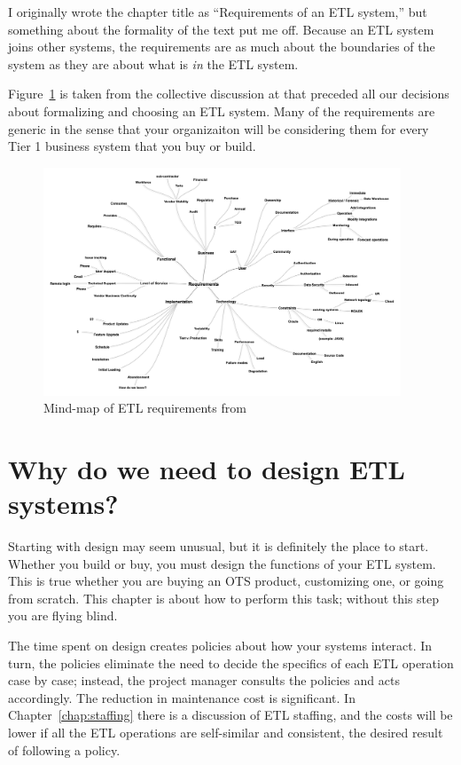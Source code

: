 \documentclass[11pt,letterpaper,twosided]{memoir}
\begin{document}
I originally wrote the chapter title as ``Requirements of an
ETL system,'' but something about the formality of the text
put me off. Because an ETL system joins other systems, the 
requirements are as much about the boundaries of the system as
they are about what is \emph{in} the ETL system.

Figure~\ref{fig:mindmap} is taken from the collective discussion
at \UR that preceded all our decisions about formalizing and 
choosing an ETL system. Many of the requirements are generic
in the sense that your organizaiton will be considering them
for every Tier 1 business system that you buy or build.

\begin{figure}
\includegraphics[width=0.95\textwidth]{mindmap.png}
\caption{Mind-map of ETL requirements from \UR}
\label{fig:mindmap}
\end{figure}

\section{Why do we need to design ETL systems?}

Starting with design may seem unusual, but it is definitely the
place to start.  Whether you build or buy, you must design the
functions of your ETL system. This is true whether you are buying
an OTS product, customizing one, or going from scratch. This chapter
is about how to perform this task; without this step you are flying
blind.

The time spent on design creates policies about how your systems
interact.  In turn, the policies eliminate the need to decide the
specifics of each ETL operation case by case; instead, the project
manager consults the policies and acts accordingly. The reduction
in maintenance cost is significant. In Chapter~\ref{chap:staffing}
there is a discussion of ETL staffing, and the costs will be lower
if all the ETL operations are self-similar and consistent, the
desired result of following a policy.
\end{document}

